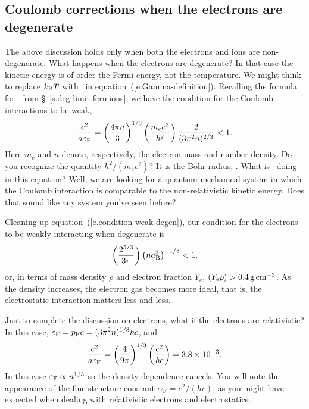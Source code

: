 \subsection[Strongly Coupled Plasmas]{Coulomb corrections when the electrons are degenerate}\label{s.degenerate-coulomb}

The above discussion holds only when both the electrons and ions are non-degenerate.  What happens when the electrons are degenerate?  In that case the kinetic energy is of order the Fermi energy, not the temperature.  We might think to replace $k_\mathrm{B} T$ with \eF\ in equation~(\ref{e.Gamma-definition}). Recalling the formula for \eF\ from \S~\ref{s.deg-limit-fermions}, we have the condition for the Coulomb interactions to be weak,
\begin{equation}\label{e.condition-weak-degen}
\frac{e^{2}}{a \varepsilon_{\mathrm{F}}} = \left(\frac{4\pi n}{3}\right)^{1/3}\left(\frac{m_{e} e^{2}}{\hbar^{2}}\right)\frac{2}{(3\pi^{2} n)^{2/3}} < 1.
\end{equation}
Here $m_{e}$ and $n$ denote, respectively, the electron mass and number density.  Do you recognize the quantity $\hbar^{2}/(m_{e}e^{2})$?  It is the Bohr radius, \abohr.  What is \abohr\ doing in this equation?  Well, we are looking for a quantum mechanical system in which the Coulomb interaction is comparable to the non-relativistic kinetic energy.  Does that sound like any system you've seen before?

Cleaning up equation~(\ref{e.condition-weak-degen}), our condition for the electrons to be weakly interacting when degenerate is
\begin{equation}
\left(\frac{2^{5/3}}{3\pi}\right)\left( n a_{\mathrm{B}}^{3}\right)^{-1/3} < 1,
\end{equation}
or, in terms of mass density $\rho$ and electron fraction $Y_{e}$, $(Y_{e}\rho) > 0.4\,\mathrm{g}\,{\mathrm{c}\mathrm{m}}^{-3}$.  As the density increases, the electron gas becomes more ideal, that is, the electrostatic interaction matters less and less.  

Just to complete the discussion on electrons, what if the electrons are relativistic?  In this case, $\varepsilon_{\mathrm{F}} = p_{\mathrm{F}} c = (3\pi^{2}n)^{1/3}\hbar c$, and
\begin{equation}\label{e.condition-weak-rel-degen}
\frac{e^{2}}{a \varepsilon_{\mathrm{F}}} = \left(\frac{4}{9\pi}\right)^{1/3}\left(\frac{e^{2}}{\hbar c}\right) = 3.8\times 10^{-3}.
\end{equation}
In this case $\varepsilon_{\mathrm{F}} \propto n^{1/3}$ so the density dependence cancels.  You will note the appearance of the fine structure constant $\alpha_{\mathrm{F}} = e^{2}/(\hbar c)$, as you might have expected when dealing with relativistic electrons and electrostatics.

